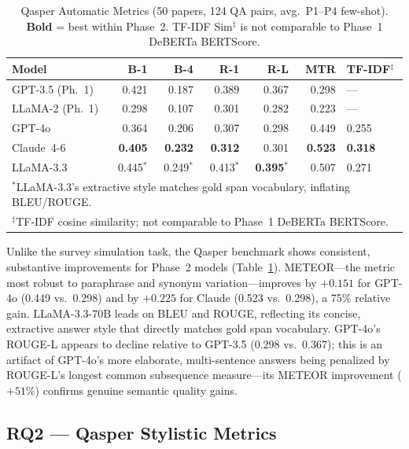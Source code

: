 \documentclass[sigconf,nonacm]{acmart}
\begin{document}
\begin{table}[t]
\caption{Qasper Automatic Metrics (50 papers, 124 QA pairs,
  avg.\ P1--P4 few-shot). \textbf{Bold} = best within Phase~2.
  TF-IDF Sim$^{\ddag}$ is not comparable to Phase~1 DeBERTa BERTScore.}
\label{tab:qasper-auto}
\centering\small
\setlength{\tabcolsep}{3.2pt}
\begin{tabular}{lrrrrrl}
\toprule
\textbf{Model} & \textbf{B-1} & \textbf{B-4}
  & \textbf{R-1} & \textbf{R-L} & \textbf{MTR}
  & \textbf{TF-IDF$^{\ddag}$} \\
\midrule
GPT-3.5 (Ph.~1) & 0.421 & 0.187 & 0.389 & 0.367 & 0.298 & --- \\
LLaMA-2 (Ph.~1) & 0.298 & 0.107 & 0.301 & 0.282 & 0.223 & --- \\
\midrule
GPT-4o          & 0.364 & 0.206 & 0.307 & 0.298 & 0.449 & 0.255 \\
Claude~4-6      & \textbf{0.405} & \textbf{0.232} & \textbf{0.312} & 0.301 & \textbf{0.523} & \textbf{0.318} \\
LLaMA-3.3       & 0.445$^{*}$ & 0.249$^{*}$ & 0.413$^{*}$ & \textbf{0.395}$^{*}$ & 0.507 & 0.271 \\
\bottomrule
\multicolumn{7}{l}{\footnotesize $^{*}$LLaMA-3.3's extractive style matches
  gold span vocabulary, inflating BLEU/ROUGE.}\\
\multicolumn{7}{l}{\footnotesize $^{\ddag}$TF-IDF cosine similarity; not
  comparable to Phase~1 DeBERTa BERTScore.}\\
\end{tabular}
\end{table}

Unlike the survey simulation task, the Qasper benchmark shows consistent,
substantive improvements for Phase~2 models (Table~\ref{tab:qasper-auto}).
METEOR---the metric most robust to paraphrase and synonym
variation---improves by $+0.151$ for GPT-4o (0.449 vs.\ 0.298) and by
$+0.225$ for Claude (0.523 vs.\ 0.298), a 75\% relative gain.
LLaMA-3.3-70B leads on BLEU and ROUGE, reflecting its concise, extractive
answer style that directly matches gold span vocabulary.
GPT-4o's ROUGE-L appears to decline relative to GPT-3.5 (0.298 vs.\ 0.367);
this is an artifact of GPT-4o's more elaborate, multi-sentence answers being
penalized by ROUGE-L's longest common subsequence measure---its METEOR
improvement ($+51\%$) confirms genuine semantic quality gains.

\subsection{RQ2 --- Qasper Stylistic Metrics}
\label{sec:results:qasper-style}
\end{document}

